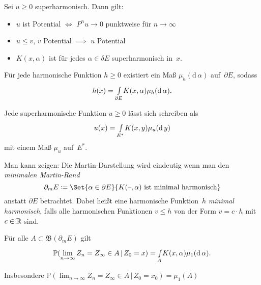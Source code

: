 \documentclass{cheat-sheet}
\renewcommand{\P}{\mathbb{P}} %
\newcommand{\Bor}{\mathfrak{B}} %
\begin{document}
\begin{lem}
  Sei $u \geq 0$ superharmonisch.
  Dann gilt:
  \begin{itemize}
    \item $u$ ist Potential $\iff$ $P^n u \to 0$ punktweise für $n \to \infty$
    \item $u \leq v$, $v$ Potential $\implies$ $u$ Potential
    \item $K(x, \alpha)$ ist für jedes $\alpha \in \delta E$ superharmonisch in~$x$.
  \end{itemize}
\end{lem}

\begin{satz}
  Für jede harmonische Funktion $h \geq 0$ existiert ein Maß $\mu_h(\mathrm{d}\,\alpha)$ auf~$\partial E$, sodass
  \[
    h(x) = {\textstyle \int\limits_{\partial E}^{}} K(x, \alpha) \mu_h(\mathrm{d}\,\alpha).
  \]
\end{satz}

\begin{kor}
  Jede superharmonische Funktion $u \geq 0$ lässt sich schreiben als
  \[
    u(x) = {\textstyle \int\limits_{E^*}^{}} K(x, y) \mu_u(\mathrm{d}\,y)
  \]
  mit einem Maß $\mu_u$ auf~$E^*$.
\end{kor}

\begin{bem}
  Man kann zeigen: Die Martin-Darstellung wird eindeutig wenn man den \emph{minimalen Martin-Rand}
  \[
    \partial_m E \coloneqq \Set{\alpha \in \partial E}{K(\blank, \alpha) \text{ ist minimal harmonisch}}
  \]
  anstatt $\partial E$ betrachtet.
  Dabei heißt eine harmonische Funktion~$h$ \textit{minimal harmonisch}, falls alle harmonischen Funktionen $v \leq h$ von der Form $v = c \cdot h$ mit $c \in \mathbb{R}$ sind.
\end{bem}

\begin{resultat}
  Für alle $A \subset \Bor(\partial_m E)$ gilt
  \[
    \P(\lim_{n \to \infty} Z_n = Z_\infty \in A \,|\, Z_0 = x) =
    \myint{A}{} K(x, \alpha) \mu_1(\d\,\alpha).
  \]
\end{resultat}

\begin{bem}
  Insbesondere $\P(\lim_{n \to \infty} Z_n = Z_\infty \in A \,|\, Z_0 = x_0) = \mu_1(A)$
\end{bem}
\end{document}
